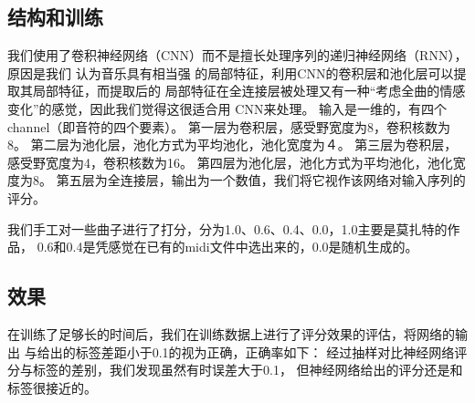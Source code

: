 \documentclass{article}
\begin{document}
  \subsection{结构和训练}
    我们使用了卷积神经网络（CNN）而不是擅长处理序列的递归神经网络（RNN），原因是我们
    认为音乐具有相当强
    的局部特征，利用CNN的卷积层和池化层可以提取其局部特征，而提取后的
    局部特征在全连接层被处理又有一种“考虑全曲的情感变化”的感觉，因此我们觉得这很适合用
    CNN来处理。
    输入是一维的，有四个channel（即音符的四个要素）。
    第一层为卷积层，感受野宽度为8，卷积核数为8。
    第二层为池化层，池化方式为平均池化，池化宽度为４。
    第三层为卷积层，感受野宽度为4，卷积核数为16。
    第四层为池化层，池化方式为平均池化，池化宽度为8。
    第五层为全连接层，输出为一个数值，我们将它视作该网络对输入序列的评分。

    我们手工对一些曲子进行了打分，分为1.0、0.6、0.4、0.0，1.0主要是莫扎特的作品，
    0.6和0.4是凭感觉在已有的midi文件中选出来的，0.0是随机生成的。
  \subsection{效果}
    在训练了足够长的时间后，我们在训练数据上进行了评分效果的评估，将网络的输出
    与给出的标签差距小于0.1的视为正确，正确率如下：
    经过抽样对比神经网络评分与标签的差别，我们发现虽然有时误差大于0.1，
    但神经网络给出的评分还是和标签很接近的。
\end{document}
